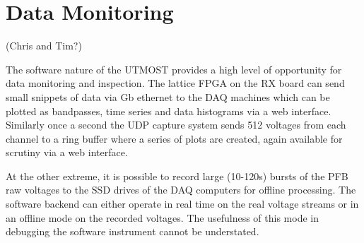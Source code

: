 \section{Data Monitoring }(Chris and Tim?)

The software nature of the UTMOST provides a high level of opportunity for data monitoring and inspection. The lattice FPGA on the RX board can send small snippets of data via Gb ethernet to the DAQ machines which can be plotted as bandpasses, time series and data histograms via a web interface. Similarly once a second the UDP capture system sends 512 voltages from each channel to a ring buffer where a series of plots are created, again available for scrutiny via a web interface.

At the other extreme, it is possible to record large (10-120s) bursts of the PFB raw voltages to the SSD drives of the DAQ computers for offline processing. The software backend can either operate in real time on the real voltage streams or in an offline mode on the recorded voltages. The usefulness of this mode in debugging the software instrument cannot be understated. 
